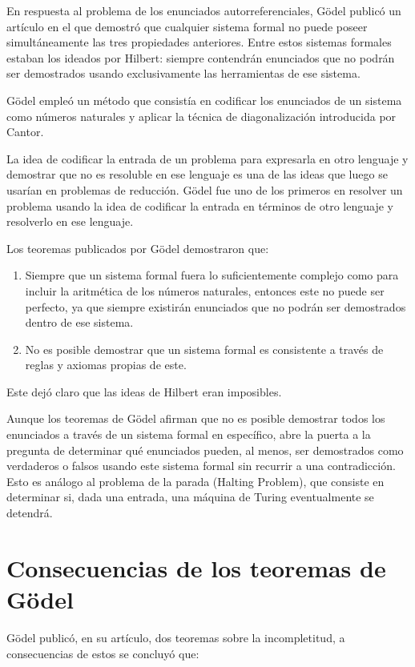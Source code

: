 \documentclass[14pt]{extarticle}
\begin{document}
En respuesta al problema de los enunciados autorreferenciales, Gödel publicó un artículo en el que demostró que cualquier sistema formal no puede poseer simultáneamente las tres propiedades anteriores.  Entre estos sistemas formales estaban los ideados por Hilbert: siempre contendrán enunciados que no podrán ser demostrados usando exclusivamente las herramientas de ese sistema.

Gödel empleó un método que consistía en codificar los enunciados de un sistema como números naturales y aplicar la técnica de diagonalización introducida por Cantor. 

La idea de codificar la entrada de un problema para expresarla en otro lenguaje y demostrar que no es resoluble en ese lenguaje es una de las ideas que luego se usarían en problemas de reducción. Gödel fue uno de los primeros en resolver un problema usando la idea de codificar la entrada en términos de otro lenguaje y resolverlo en ese lenguaje.

Los teoremas publicados por Gödel demostraron que: 

\begin{enumerate}
    \item Siempre que un sistema formal fuera lo suficientemente complejo como para incluir la aritmética de los números naturales, entonces este no puede ser perfecto, ya que siempre existirán enunciados que no podrán ser demostrados dentro de ese sistema.
    \item No es posible demostrar que un sistema formal es consistente a través de reglas y axiomas propias de este.  
\end{enumerate}

Este dejó claro que las ideas de Hilbert eran imposibles. \cite{godel}

Aunque los teoremas de Gödel afirman que no es posible demostrar todos los enunciados a través de un sistema formal en específico, abre la puerta a la pregunta de determinar qué enunciados pueden, al menos, ser demostrados como verdaderos o falsos usando este sistema formal sin recurrir a una contradicción. Esto es análogo al problema de la parada (Halting Problem), que consiste en determinar si, dada una entrada, una máquina de Turing eventualmente se detendrá.


\section{Consecuencias de los teoremas de Gödel}

Gödel publicó, en su artículo, dos teoremas sobre la incompletitud, a consecuencias de estos se concluyó que:
\end{document}

